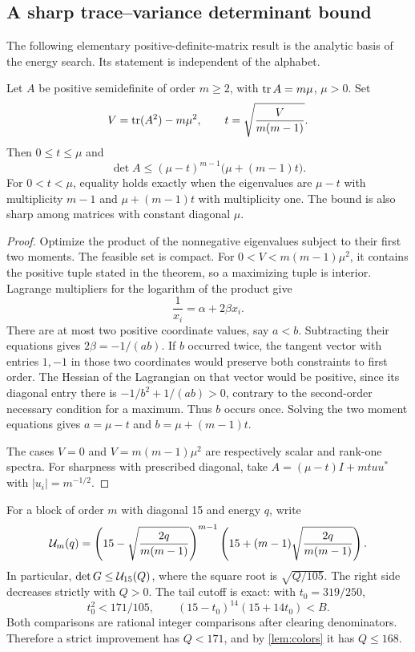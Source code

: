 \subsection{A sharp trace--variance determinant bound}
The following elementary positive-definite-matrix result is the analytic basis of the energy search. Its statement is independent of the alphabet.
\begin{theorem}\label{thm:envelope}
Let $A$ be positive semidefinite of order $m\ge2$, with $\operatorname{tr} A=m\mu$, $\mu>0$. Set
\[
 V=\operatorname{tr}(A^2)-m\mu^2,\qquad
 t=\sqrt{\frac{V}{m(m-1)}}.
\]
Then $0\le t\le\mu$ and
\begin{equation}\label{eq:envelope}
 \det A\le (\mu-t)^{m-1}\bigl(\mu+(m-1)t\bigr).
\end{equation}
For $0<t<\mu$, equality holds exactly when the eigenvalues are $\mu-t$ with multiplicity $m-1$ and $\mu+(m-1)t$ with multiplicity one. The bound is also sharp among matrices with constant diagonal $\mu$.
\end{theorem}
\begin{proof}
Optimize the product of the nonnegative eigenvalues subject to their first two moments. The feasible set is compact. For $0<V<m(m-1)\mu^2$, it contains the positive tuple stated in the theorem, so a maximizing tuple is interior. Lagrange multipliers for the logarithm of the product give
\[
 \frac1{x_i}=\alpha+2\beta x_i.
\]
There are at most two positive coordinate values, say $a<b$. Subtracting their equations gives $2\beta=-1/(ab)$. If $b$ occurred twice, the tangent vector with entries $1,-1$ in those two coordinates would preserve both constraints to first order. The Hessian of the Lagrangian on that vector would be positive, since its diagonal entry there is $-1/b^2+1/(ab)>0$, contrary to the second-order necessary condition for a maximum. Thus $b$ occurs once. Solving the two moment equations gives $a=\mu-t$ and $b=\mu+(m-1)t$.

The cases $V=0$ and $V=m(m-1)\mu^2$ are respectively scalar and rank-one spectra. For sharpness with prescribed diagonal, take
$A=(\mu-t)I+mtuu^*$ with $|u_i|=m^{-1/2}$.
\end{proof}
For a block of order $m$ with diagonal 15 and energy $q$, write
\[
 \mathcal U_m(q)=\left(15-\sqrt{\frac{2q}{m(m-1)}}\right)^{m-1}
 \left(15+(m-1)\sqrt{\frac{2q}{m(m-1)}}\right).
\]
In particular, $\det G\le\mathcal U_{15}(Q)$, where the square root is $\sqrt{Q/105}$. The right side decreases strictly with $Q>0$. The tail cutoff is exact: with $t_0=319/250$,
\begin{equation}\label{eq:tail}
 t_0^2<171/105,\qquad
 (15-t_0)^{14}(15+14t_0)<B.
\end{equation}
Both comparisons are rational integer comparisons after clearing denominators. Therefore a strict improvement has $Q<171$, and by \cref{lem:colors} it has $Q\le168$.

